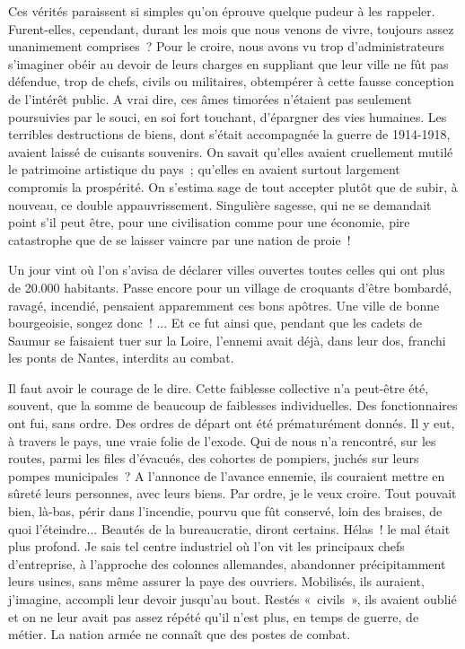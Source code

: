 \documentclass[french,twoside]{book} %
\begin{document}
Ces vérités paraissent si simples qu’on éprouve quelque pudeur à les rappeler. Furent-elles, cependant, durant les mois que nous venons de vivre, toujours assez unanimement comprises ? Pour le croire, nous avons vu trop d’administrateurs s’imaginer obéir au devoir de leurs charges en suppliant que leur ville ne fût pas défendue, trop de chefs, civils ou militaires, obtempérer à cette fausse conception de l’intérêt public. A vrai dire, ces âmes timorées n’étaient pas seulement poursuivies par le souci, en soi fort touchant, d’épargner des vies humaines. Les terribles destructions de biens, dont s’était accompagnée la guerre de 1914-1918, avaient laissé de cuisants souvenirs. On savait qu’elles avaient cruellement mutilé le patrimoine artistique du pays ; qu’elles en avaient surtout largement compromis la prospérité. On s’estima sage de tout accepter plutôt que de subir, à nouveau, ce double appauvrissement. Singulière sagesse, qui ne se demandait point s’il peut être, pour une civilisation comme pour une économie, pire catastrophe que de se laisser vaincre par une nation de proie !\par
Un jour vint où l’on s’avisa de déclarer villes ouvertes toutes celles qui ont plus de 20.000 habitants. Passe encore pour un village de croquants d’être bombardé, ravagé, incendié, pensaient apparemment ces bons apôtres. Une ville de bonne   bourgeoisie, songez donc ! ... Et ce fut ainsi que, pendant que les cadets de Saumur se faisaient tuer sur la Loire, l’ennemi avait déjà, dans leur dos, franchi les ponts de Nantes, interdits au combat.\par
Il faut avoir le courage de le dire. Cette faiblesse collective n’a peut-être été, souvent, que la somme de beaucoup de faiblesses individuelles. Des fonctionnaires ont fui, sans ordre. Des ordres de départ ont été prématurément donnés. Il y eut, à travers le pays, une vraie folie de l’exode. Qui de nous n’a rencontré, sur les routes, parmi les files d’évacués, des cohortes de pompiers, juchés sur leurs pompes municipales ? A l’annonce de l’avance ennemie, ils couraient mettre en sûreté leurs personnes, avec leurs biens. Par ordre, je le veux croire. Tout pouvait bien, là-bas, périr dans l’incendie, pourvu que fût conservé, loin des braises, de quoi l’éteindre... Beautés de la bureaucratie, diront certains. Hélas ! le mal était plus profond. Je sais tel centre industriel où l’on vit les principaux chefs d’entreprise, à l’approche des colonnes allemandes, abandonner précipitamment leurs usines, sans même assurer la paye des ouvriers. Mobilisés, ils auraient, j’imagine, accompli leur devoir jusqu’au bout. Restés « civils », ils avaient oublié et on ne leur avait pas assez répété qu’il n’est plus, en temps de guerre, de métier. La nation armée ne connaît que des postes de combat.\par
\end{document}
